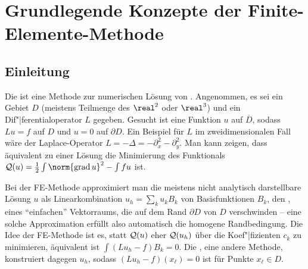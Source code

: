 \section{%
    Grundlegende Konzepte der Finite-Elemente-Methode%
}

\subsection{%
    Einleitung%
}

Die 
ist eine Methode zur numerischen Lösung von .
Angenommen, es sei ein Gebiet $D$ (meistens Teilmenge des $\real^2$ oder $\real^3$) und ein
Dif"|ferentialoperator $L$ gegeben.
Gesucht ist eine Funktion $u$ auf $\overline{D}$, sodass $Lu = f$ auf $D$ und $u = 0$ auf
$\partial D$.
Ein Beispiel für $L$ im zweidimensionalen Fall wäre der Laplace-Operator
$L = -\Delta = -\partial_x^2 - \partial_y^2$.
Man kann zeigen, dass äquivalent zu einer Lösung die Minimierung des Funktionals
$\Q(u) = \frac{1}{2} \int \norm{\grad u}^2 - \int fu$ ist.

Bei der FE-Methode approximiert man die meistens nicht analytisch darstellbare Lösung $u$
als Linearkombination $u_h = \sum_k u_k B_k$ von Basisfunktionen
$B_k$, den , eines "`einfachen"' Vektorraums,
die auf dem Rand $\partial D$ von $D$ verschwinden --
eine solche Approximation erfüllt also automatisch die homogene Randbedingung.
Die Idee der FE-Methode ist es, statt $\mathcal{Q}(u)$ eher $\mathcal{Q}(u_h)$ über die Koef"|fizienten $c_k$
zu minimieren, äquivalent ist $\int (Lu_h - f) B_k = 0$.
Die , eine andere Methode, konstruiert dagegen $u_h$, sodass
$(Lu_h - f)(x_\ell) = 0$ ist für Punkte $x_\ell \in D$.

